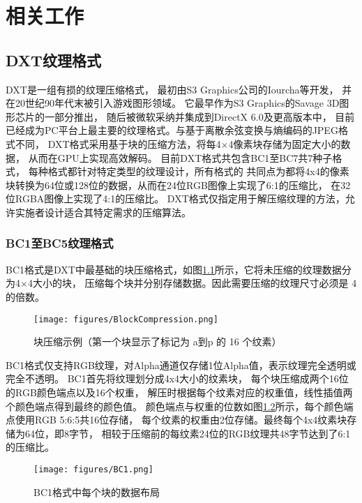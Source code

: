 
\chapter{相关工作}

\section{DXT纹理格式}

DXT是一组有损的纹理压缩格式，
最初由S3 Graphics公司的Iourcha等\cite{iourcha1999system}开发，
并在20世纪90年代末被引入游戏图形领域。
它最早作为S3 Graphics的Savage 3D图形芯片的一部分推出，
随后被微软采纳并集成到DirectX 6.0及更高版本中，
目前已经成为PC平台上最主要的纹理格式。与基于离散余弦变换与熵编码的JPEG格式不同，
DXT格式采用基于块的压缩方法，将每4×4像素块存储为固定大小的数据，
从而在GPU上实现高效解码。
目前DXT格式共包含BC1至BC7共7种子格式，
每种格式都针对特定类型的纹理设计，所有格式的
共同点为都将4x4的像素块转换为64位或128位的数据，从而在24位RGB图像上实现了6:1的压缩比，
在32位RGBA图像上实现了4:1的压缩比。
DXT格式仅指定用于解压缩纹理的方法，允许实施者设计适合其特定需求的压缩算法。

\subsection{BC1至BC5纹理格式}

BC1格式是DXT中最基础的块压缩格式，如图\ref{fig:BlockCompression}所示，它将未压缩的纹理数据分为4×4大小的块，
压缩每个块并分别存储数据。因此需要压缩的纹理尺寸必须是 4 的倍数。

\begin{figure}[htbp]
    \centering
    \texttt{[image: figures/BlockCompression.png]}
    \caption{块压缩示例（第一个块显示了标记为 a到p 的 16 个纹素）}
    \label{fig:BlockCompression}
\end{figure}

BC1格式仅支持RGB纹理，对Alpha通道仅存储1位Alpha值，表示纹理完全透明或完全不透明。
BC1首先将纹理划分成4x4大小的纹素块，
每个块压缩成两个16位的RGB颜色端点以及16个权重，
解压时根据每个纹素对应的权重值，线性插值两个颜色端点得到最终的颜色值。
颜色端点与权重的位数如图\ref{fig:BC1}所示，每个颜色端点使用RGB 5:6:5共16位存储，
每个纹素的权重由2位存储。最终每个4x4纹素块存储为64位，即8字节，
相较于压缩前的每纹素24位的RGB纹理共48字节达到了6:1的压缩比。

\begin{figure}[htbp]
    \centering
    \texttt{[image: figures/BC1.png]}
    \caption{BC1格式中每个块的数据布局}
    \label{fig:BC1}
\end{figure}

